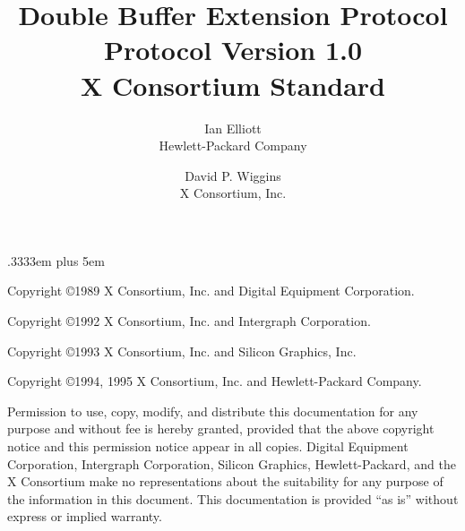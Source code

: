 \newenvironment{etypedef}[1]{\begin{keeptogether} \typename{#1} \begin{tabbing} \etabstops }{\end{tabbing} \end{keeptogether}}

\newcommand{\cfunctionname}[1]{\mbox{\tt #1}}
\newcommand{\cfunctiondecl}[1]{\mbox{\rm #1}}
\newcommand{\cargdecl}[2]{\penalty -1\typename{#1} \argname{#2}}
\newenvironment{cfunction}[2]{\begin{sloppypar}\begin{keeptogether}\vspace{5mm}\typename{#1}\\ \cfunctiondecl{#2}\ (}{)\end{keeptogether}\end{sloppypar}{\hangafter=2 \hangindent=20pt \raggedright\par}}

\spaceskip .3333em plus 5em



\title{Double Buffer Extension Protocol\\Protocol Version 1.0\\X Consortium Standard}
\author{Ian Elliott\\Hewlett-Packard Company \and David P. Wiggins\\X Consortium, Inc.}
\maketitle
\thispagestyle{empty}

\eject

Copyright \copyright 1989 X Consortium, Inc. and Digital Equipment Corporation.

Copyright \copyright 1992 X Consortium, Inc. and Intergraph Corporation.

Copyright \copyright 1993 X Consortium, Inc. and Silicon Graphics, Inc.

Copyright \copyright 1994, 1995 X Consortium, Inc. and Hewlett-Packard Company.

Permission to use, copy, modify, and distribute this documentation for
any purpose and without fee is hereby granted, provided that the above
copyright notice and this permission notice appear in all copies.
Digital Equipment Corporation, Intergraph Corporation, Silicon
Graphics, Hewlett-Packard, and the X Consortium make no
representations about the suitability for any purpose of the
information in this document.  This documentation is provided ``as is''
without express or implied warranty.

